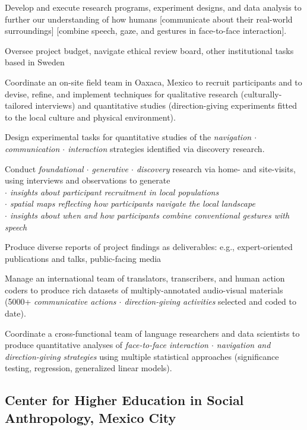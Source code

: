 Develop and execute research programs, experiment designs, and data analysis to further our understanding of how humans [communicate about their real-world surroundings] [combine speech, gaze, and gestures in face-to-face interaction].

Oversee project budget, navigate ethical review board, other institutional tasks based in Sweden

Coordinate an on-site field team in Oaxaca, Mexico to recruit participants and to devise, refine, and implement techniques for qualitative research (culturally-tailored interviews) and quantitative studies (direction-giving experiments fitted to the local culture and physical environment).

Design experimental tasks for quantitative studies of the \emph{navigation $\cdot$ communication $\cdot$ interaction} strategies identified via discovery research.

Conduct \emph{foundational $\cdot$ generative $\cdot$ discovery} research via home- and site-visits, using interviews and observations to generate\\ \emph{
$\cdot$ insights about participant recruitment in local populations \\
$\cdot$ spatial maps reflecting how participants navigate the local landscape \\
$\cdot$ insights about when and how participants combine conventional gestures with speech
}


Produce diverse reports of project findings as deliverables: e.g., expert-oriented publications and talks, public-facing media




Manage an international team of translators, transcribers, and human action coders to produce rich datasets of multiply-annotated audio-visual materials (5000+ \emph{communicative actions $\cdot$ direction-giving activities} selected and coded to date).

Coordinate a cross-functional team of language researchers and data scientists to produce quantitative analyses of  \emph{face-to-face interaction $\cdot$ navigation and direction-giving strategies} using multiple statistical approaches (significance testing, regression, generalized linear models).

\subsection{Center for Higher Education in Social Anthropology, Mexico City}

